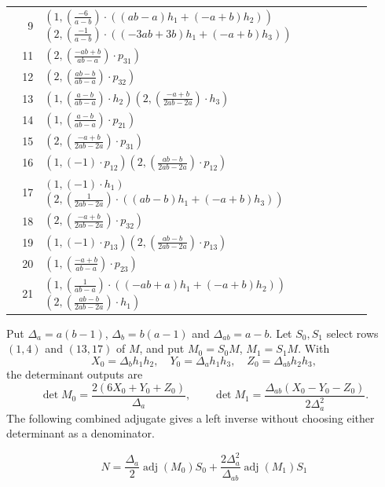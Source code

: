 \begin{longtable}{@{}r>{\raggedright\arraybackslash}p{0.91\linewidth}@{}}
9 & \((1,\left(\frac{-6}{a - b}\right) \cdot (\left(a b - a\right) h_1 + \left(-a + b\right) h_2))\)\allowbreak\quad \((2,\left(\frac{-1}{a - b}\right) \cdot (\left(-3 a b + 3 b\right) h_1 + \left(-a + b\right) h_3))\)\\
11 & \((2,\left(\frac{-a b + b}{a b - a}\right) \cdot p_{31})\)\\
12 & \((2,\left(\frac{a b - b}{a b - a}\right) \cdot p_{32})\)\\
13 & \((1,\left(\frac{a - b}{a b - a}\right) \cdot h_2)\)\allowbreak\quad \((2,\left(\frac{-a + b}{2 a b - 2 a}\right) \cdot h_3)\)\\
14 & \((1,\left(\frac{a - b}{a b - a}\right) \cdot p_{21})\)\\
15 & \((2,\left(\frac{-a + b}{2 a b - 2 a}\right) \cdot p_{31})\)\\
16 & \((1,\left(-1\right) \cdot p_{12})\)\allowbreak\quad \((2,\left(\frac{a b - b}{2 a b - 2 a}\right) \cdot p_{12})\)\\
17 & \((1,\left(-1\right) \cdot h_1)\)\allowbreak\quad \((2,\left(\frac{1}{2 a b - 2 a}\right) \cdot (\left(a b - b\right) h_1 + \left(-a + b\right) h_3))\)\\
18 & \((2,\left(\frac{-a + b}{2 a b - 2 a}\right) \cdot p_{32})\)\\
19 & \((1,\left(-1\right) \cdot p_{13})\)\allowbreak\quad \((2,\left(\frac{a b - b}{2 a b - 2 a}\right) \cdot p_{13})\)\\
20 & \((1,\left(\frac{-a + b}{a b - a}\right) \cdot p_{23})\)\\
21 & \((1,\left(\frac{1}{a b - a}\right) \cdot (\left(-a b + a\right) h_1 + \left(-a + b\right) h_2))\)\allowbreak\quad \((2,\left(\frac{a b - b}{2 a b - 2 a}\right) \cdot h_1)\)\\
\end{longtable}
\endgroup

Put $\Delta_a=a(b-1)$, $\Delta_b=b(a-1)$ and
$\Delta_{ab}=a-b$. Let $S_0,S_1$ select rows $(1,4)$ and $(13,17)$
of $M$, and put $M_0=S_0M$, $M_1=S_1M$. With
\[
 X_0=\Delta_bh_1h_2,\quad Y_0=\Delta_ah_1h_3,
 \quad Z_0=\Delta_{ab}h_2h_3,
\]
the determinant outputs are
\[
 \det M_0=\frac{2(6X_0+Y_0+Z_0)}{\Delta_a},\qquad
 \det M_1=\frac{\Delta_{ab}(X_0-Y_0-Z_0)}{2\Delta_a^2}.
\]
The following combined adjugate gives a left inverse without
choosing either determinant as a denominator.

\begin{equation}\label{supp:fnd:uleftinverse}
N=\frac{\Delta_a}{2}\operatorname{adj}(M_0)S_0+
\frac{2\Delta_a^2}{\Delta_{ab}}\operatorname{adj}(M_1)S_1
\end{equation}

